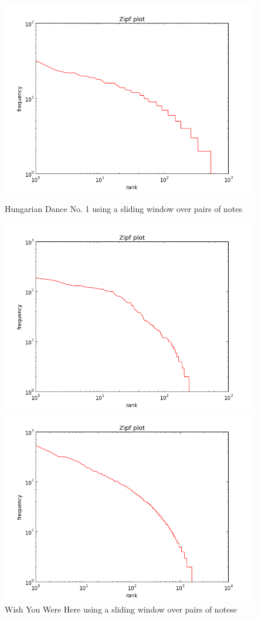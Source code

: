 \documentclass[10pt]{book}
\begin{document}
\begin{figure}[!htb]
  \includegraphics[width=\linewidth]{hungdan_notes_2}
  \caption{Hungarian Dance No. 1 using a sliding window over pairs of notes}\label{fig:hungdan_notes_2}
\endminipage\hfill
{}
  \includegraphics[width=\linewidth]{wish_notes_2}
  \caption{Wish You Were Here using a sliding window over pairs of notese}\label{fig:wish_notes_2}
\endminipage\hfill
{}%
  \includegraphics[width=\linewidth]{rach_notes_2}

\end{figure}
\end{document}
